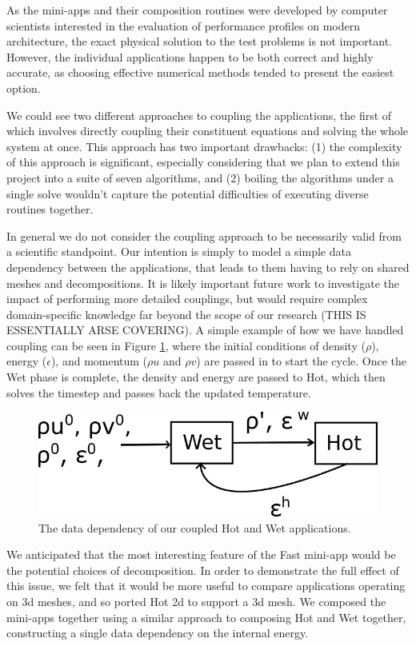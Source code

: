 \documentclass[runningheads,a4paper]{llncs}
\begin{document}
As the mini-apps and their composition routines were developed by computer scientists interested in the evaluation of performance profiles on modern architecture, the exact physical solution to the test problems is not important. However, the individual applications happen to be both correct and highly accurate, as choosing effective numerical methods tended to present the easiest option. 

We could see two different approaches to coupling the applications, the first of which involves directly coupling their constituent equations and solving the whole system at once. This approach has two important drawbacks: (1) the complexity of this approach is significant, especially considering that we plan to extend this project into a suite of seven algorithms, and (2) boiling the algorithms under a single solve wouldn't capture the potential difficulties of executing diverse routines together.


In general we do not consider the coupling approach to be necessarily valid from a scientific standpoint. Our intention is simply to model a simple data dependency between the applications, that leads to them having to rely on shared meshes and decompositions. It is likely important future work to investigate the impact of performing more detailed couplings, but would require complex domain-specific knowledge far beyond the scope of our research (THIS IS ESSENTIALLY ARSE COVERING). A simple example of how we have handled coupling can be seen in Figure \ref{fig:hot-wet-flow}, where the initial conditions of density ($\rho$), energy ($\epsilon$), and momentum ($\rho u$ and $\rho v$) are passed in to start the cycle. Once the Wet phase is complete, the density and energy are passed to Hot, which then solves the timestep and passes back the updated temperature.

\begin{figure}
  \centering
  \includegraphics[width=0.6\linewidth]{hot-wet-flow}
  \caption{The data dependency of our coupled Hot and Wet applications.}
  \label{fig:hot-wet-flow}
\end{figure}

We anticipated that the most interesting feature of the Fast mini-app would be the potential choices of decomposition. In order to demonstrate the full effect of this issue, we felt that it would be more useful to compare applications operating on 3d meshes, and so ported Hot 2d to support a 3d mesh. We composed the mini-apps together using a similar approach to composing Hot and Wet together, constructing a single data dependency on the internal energy.
\end{document}
